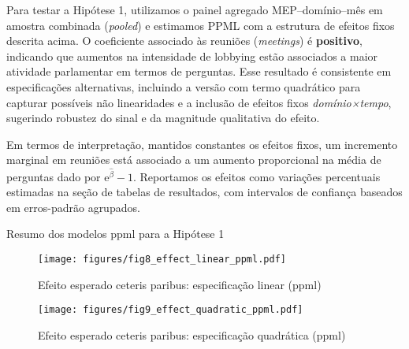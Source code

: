 Para testar a Hipótese 1, utilizamos o painel agregado MEP–domínio–mês em amostra combinada (\textit{pooled}) e estimamos PPML com a estrutura de efeitos fixos descrita acima. O coeficiente associado às reuniões (\textit{meetings}) é \textbf{positivo}, indicando que aumentos na intensidade de lobbying estão associados a maior atividade parlamentar em termos de perguntas. Esse resultado é consistente em especificações alternativas, incluindo a versão com termo quadrático para capturar possíveis não linearidades e a inclusão de efeitos fixos \textit{domínio×tempo}, sugerindo robustez do sinal e da magnitude qualitativa do efeito.

Em termos de interpretação, mantidos constantes os efeitos fixos, um incremento marginal em reuniões está associado a um aumento proporcional na média de perguntas dado por \(\mathrm{e}^{\hat{\beta}}-1\). Reportamos os efeitos como variações percentuais estimadas na seção de tabelas de resultados, com intervalos de confiança baseados em erros-padrão agrupados.

\begin{table}[htbp]
\centering
\caption{Resumo dos modelos \acrshort{ppml} para a Hipótese 1}
\label{tab:ppml_h1_both}

\end{table}

\begin{figure}[htbp]
\centering
\texttt{[image: figures/fig8\_effect\_linear\_ppml.pdf]}
\caption{Efeito esperado ceteris paribus: especificação linear (\acrshort{ppml})}
\label{fig:effect_linear_ppml}
\end{figure}

\begin{figure}[htbp]
\centering
\texttt{[image: figures/fig9\_effect\_quadratic\_ppml.pdf]}
\caption{Efeito esperado ceteris paribus: especificação quadrática (\acrshort{ppml})}
\label{fig:effect_quadratic_ppml}
\end{figure}


